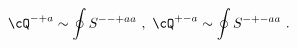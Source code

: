 \begin{equation}
  \cQ^{-+a} \sim \oint S^{--+aa} ~,~
 \cQ^{+-a} \sim \oint S^{-+-aa}  ~.
\label{extraSC}
\end{equation}


